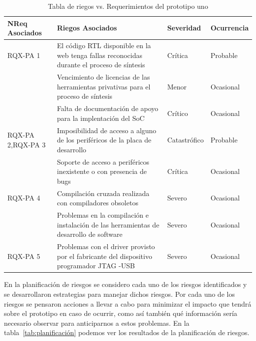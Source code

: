 \hspace{-15mm}
\vspace{-10mm}
		\begin{table}[h!]
		\centering
		\begin{tabular}{ p{2.5cm} p{9cm} p{1.5cm} p{2cm} }
		\hline 
		\rowcolor[gray]{0.8} N\textordmasculine Req Asociados& Riegos Asociados & Severidad  & Ocurrencia \\
		\hline
		RQX-PA 1& El código RTL disponible en la web tenga fallas reconocidas durante el proceso de síntesis 	 & Crítica       & Probable \\
		\hline
				& Vencimiento de licencias de las herramientas privativas para el proceso de síntesis  & Menor  & Ocasional\\
		\hline
				& Falta de documentación de apoyo para la implentación
del SoC & Crítico & Ocasional\\	 
		\hline

		RQX-PA 2,RQX-PA 3 & Imposibilidad de acceso a alguno de los periféricos de la placa de desarrollo &  Catastrófico  & Probable\\
		\hline
		& Soporte de acceso a periféricos inexistente o con presencia
de bugs & Crítica  & Ocasional\\	 
		\hline
		RQX-PA 4& Compilación cruzada realizada con compiladores obsoletos & Severo  &  Ocasional\\ 
		\hline
		&Problemas en la compilación e instalación de las herramientas de desarrollo de software  & Severo  &  Ocasional\\ 
		\hline
		RQX-PA 5& Problemas con el driver provisto por el fabricante del  dispositivo programador JTAG -USB & Severo&  Ocasional\\
		\hline
		\end{tabular}
		\caption{Tabla de riegos vs. Requerimientos del prototipo uno}
		\label{tab:riegos}
		\end{table}

En la planificación de riesgos se considero cada uno de los riesgos identificados y se desarrollaron estrategias para manejar dichos riesgos. Por cada uno de los riesgos se pensaron acciones a llevar a cabo para minimizar el impacto que tendrá sobre el prototipo en caso de ocurrir, como así también qué información sería necesario observar para anticiparnos a estos problemas.
En la tabla~\ref{tab:planificación} podemos ver los resultados de la planificación de riesgos.


